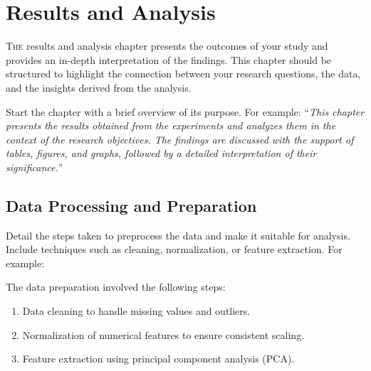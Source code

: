 %
%
%
%
%
%

\chapter{Results and Analysis}\label{chap:results}
\lettrine[lines=3]{T}{he} results and analysis chapter presents the outcomes of your study and provides an in-depth interpretation of the findings. This chapter should be structured to highlight the connection between your research questions, the data, and the insights derived from the analysis.

Start the chapter with a brief overview of its purpose. For example: ``\textit{This chapter presents the results obtained from the experiments and analyzes them in the context of the research objectives. The findings are discussed with the support of tables, figures, and graphs, followed by a detailed interpretation of their significance.}''

\section{Data Processing and Preparation}\label{sec:data-processing}
Detail the steps taken to preprocess the data and make it suitable for analysis. Include techniques such as cleaning, normalization, or feature extraction. For example:

The data preparation involved the following steps:
\begin{enumerate}
    \item Data cleaning to handle missing values and outliers.
    \item Normalization of numerical features to ensure consistent scaling.
    \item Feature extraction using principal component analysis (PCA).
\end{enumerate}

